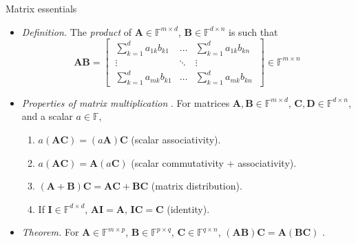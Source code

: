 \documentclass{beamer}
\numberwithin{equation}{section}
\begin{document}
\begin{frame}{Matrix essentials}
    \begin{itemize}
        \item
        \textit{Definition.} The \textit{product} of $ \mathbf{A} \in
        \mathbb{F}^{m \times d} $, $ \mathbf{B} \in \mathbb{F}^{d \times n} $
        is such that
        \begin{equation*}
            \mathbf{AB} = \begin{bmatrix}
                \ \sum_{k = 1}^da_{1k}b_{k1} & \ldots &
                    \sum_{k = 1}^da_{1k}b_{kn} \ \\
                \ \vdots & \ddots & \vdots \ \\
                \ \sum_{k = 1}^da_{mk}b_{k1} & \ldots &
                    \sum_{k = 1}^da_{mk}b_{kn} \
            \end{bmatrix} \in \mathbb{F}^{m \times n}
        \end{equation*}

        \item
	    \textit{Properties of matrix multiplication} \cite{jacob_linalg}. For
	    matrices $ \mathbf{A}, \mathbf{B} \in \mathbb{F}^{m \times d} $,
	    $ \mathbf{C}, \mathbf{D} \in \mathbb{F}^{d \times n} $, and a scalar
	    $ a \in \mathbb{F} $,
	    \begin{enumerate}
	        \item
            $ a(\mathbf{AC}) = (a\mathbf{A})\mathbf{C} $ (scalar
            associativity).

            \item
            $ a(\mathbf{AC}) = \mathbf{A}(a\mathbf{C}) $ (scalar
            commutativity + associativity).

            \item
            $ (\mathbf{A} + \mathbf{B})\mathbf{C} =
            \mathbf{AC} + \mathbf{BC} $ (matrix distribution).

            \item
            If $ \mathbf{I} \in \mathbb{F}^{d \times d} $,
            $ \mathbf{AI} = \mathbf{A} $, $ \mathbf{IC} = \mathbf{C} $
            (identity).
	    \end{enumerate}

        \item
        \textit{Theorem.} For $ \mathbf{A} \in \mathbb{F}^{m \times p} $,
        $ \mathbf{B} \in \mathbb{F}^{p \times q} $, $ \mathbf{C} \in
        \mathbb{F}^{q \times n} $, $ (\mathbf{AB})\mathbf{C} = 
        \mathbf{A}(\mathbf{BC}) $ \cite{jacob_linalg}.
    \end{itemize}
\end{frame}
\end{document}
